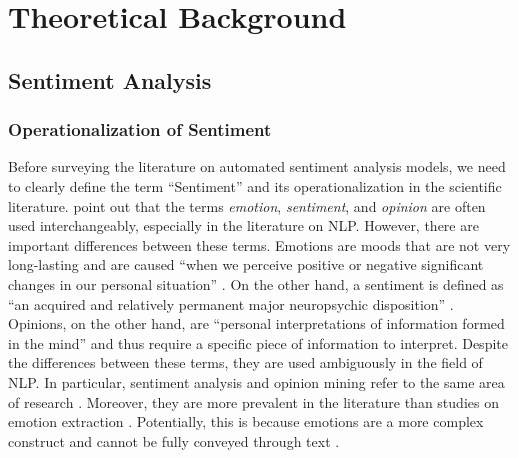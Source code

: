 \section{Theoretical Background}



\subsection{Sentiment Analysis}  %
\subsubsection{Operationalization of Sentiment}
Before surveying the literature on automated sentiment analysis models, we need to clearly define the term ``Sentiment'' and its operationalization in the scientific literature.  point out that the terms \emph{emotion}, \emph{sentiment}, and \emph{opinion} are often used interchangeably, especially in the literature on NLP. However, there are important differences between these terms. Emotions are moods that are not very long-lasting and are caused ``when we perceive positive or negative significant changes in our personal situation'' . On the other hand, a sentiment is defined as ``an acquired and relatively permanent major neuropsychic disposition'' \cite[p.~16]{cattell1940sentiment}. Opinions, on the other hand, are ``personal interpretations of information formed in the mind'' \cite[p.~4]{munezero2014they} and thus require a specific piece of information to interpret. Despite the differences between these terms, they are used ambiguously in the field of NLP. In particular, sentiment analysis and opinion mining refer to the same area of research \cite{liu2012book}. Moreover, they are more prevalent in the literature than studies on emotion extraction . Potentially, this is because emotions are a more complex construct and cannot be fully conveyed through text .

